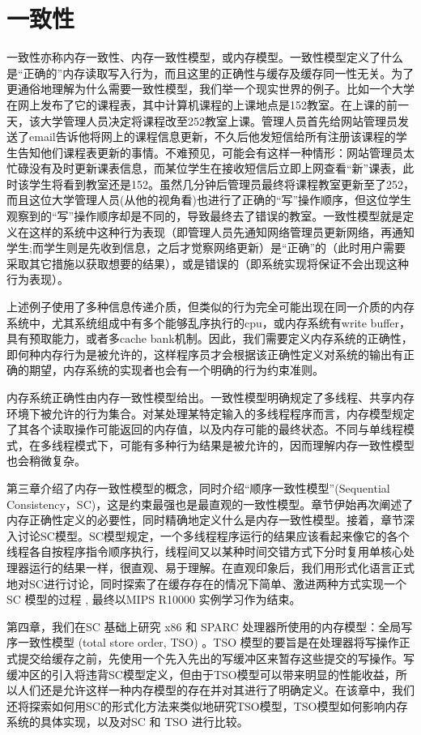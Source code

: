 \documentclass[UTF-8]{ctexrep}
\begin{document}
\section{一致性}
\par 一致性亦称内存一致性、内存一致性模型，或内存模型。一致性模型定义了什么是“正确的”内存读取写入行为，而且这里的正确性与缓存及缓存同一性无关。为了更通俗地理解为什么需要一致性模型，我们举一个现实世界的例子。比如一个大学在网上发布了它的课程表，其中计算机课程的上课地点是152教室。在上课的前一天，该大学管理人员决定将课程改至252教室上课。管理人员首先给网站管理员发送了email告诉他将网上的课程信息更新，不久后他发短信给所有注册该课程的学生告知他们课程表更新的事情。不难预见，可能会有这样一种情形：网站管理员太忙碌没有及时更新课表信息，而某位学生在接收短信后立即上网查看“新”课表，此时该学生将看到教室还是152。虽然几分钟后管理员最终将课程教室更新至了252，而且这位大学管理人员(从他的视角看)也进行了正确的“写”操作顺序，但这位学生观察到的“写”操作顺序却是不同的，导致最终去了错误的教室。一致性模型就是定义在这样的系统中这种行为表现（即管理人员先通知网络管理员更新网络，再通知学生;而学生则是先收到信息，之后才觉察网络更新）是“正确”的（此时用户需要采取其它措施以获取想要的结果），或是错误的（即系统实现将保证不会出现这种行为表现）。
\par 上述例子使用了多种信息传递介质，但类似的行为完全可能出现在同一介质的内存系统中，尤其系统组成中有多个能够乱序执行的cpu，或内存系统有write buffer，具有预取能力，或者多cache bank机制。因此，我们需要定义内存系统的正确性，即何种内存行为是被允许的，这样程序员才会根据该正确性定义对系统的输出有正确的期望，内存系统的实现者也会有一个明确的行为约束准则。
\par 内存系统正确性由内存一致性模型给出。一致性模型明确规定了多线程、共享内存环境下被允许的行为集合。对某处理某特定输入的多线程程序而言，内存模型规定了其各个读取操作可能返回的内存值，以及内存可能的最终状态。不同与单线程模式，在多线程模式下，可能有多种行为结果是被允许的，因而理解内存一致性模型也会稍微复杂。
\par 第三章介绍了内存一致性模型的概念，同时介绍“顺序一致性模型”(Sequential Consistency，SC)，这是约束最强也是最直观的一致性模型。章节伊始再次阐述了内存正确性定义的必要性，同时精确地定义什么是内存一致性模型。接着，章节深入讨论SC模型。SC模型规定，一个多线程程序运行的结果应该看起来像它的各个线程各自按程序指令顺序执行，线程间又以某种时间交错方式下分时复用单核心处理器运行的结果一样，很直观、易于理解。在直观印象后，我们用形式化语言正式地对SC进行讨论，同时探索了在缓存存在的情况下简单、激进两种方式实现一个SC 模型的过程 , 最终以MIPS R10000 实例学习作为结束。
\par 第四章，我们在SC 基础上研究 x86 和 SPARC 处理器所使用的内存模型：全局写序一致性模型 (total store order, TSO) 。TSO 模型的要旨是在处理器将写操作正式提交给缓存之前，先使用一个先入先出的写缓冲区来暂存这些提交的写操作。写缓冲区的引入将违背SC模型定义，但由于TSO模型可以带来明显的性能收益，所以人们还是允许这样一种内存模型的存在并对其进行了明确定义。在该章中，我们还将探索如何用SC的形式化方法来类似地研究TSO模型，TSO模型如何影响内存系统的具体实现，以及对SC 和 TSO 进行比较。
\end{document}

